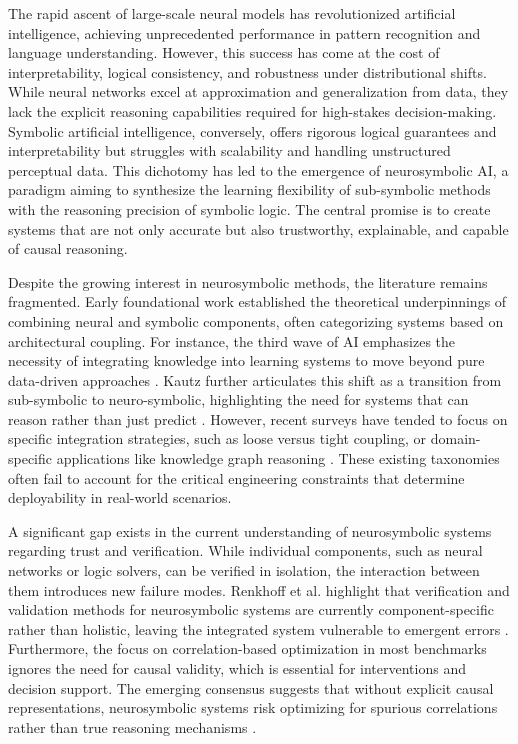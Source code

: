 \documentclass{article}
\begin{document}
The rapid ascent of large-scale neural models has revolutionized artificial intelligence, achieving unprecedented performance in pattern recognition and language understanding. However, this success has come at the cost of interpretability, logical consistency, and robustness under distributional shifts. While neural networks excel at approximation and generalization from data, they lack the explicit reasoning capabilities required for high-stakes decision-making. Symbolic artificial intelligence, conversely, offers rigorous logical guarantees and interpretability but struggles with scalability and handling unstructured perceptual data. This dichotomy has led to the emergence of neurosymbolic AI, a paradigm aiming to synthesize the learning flexibility of sub-symbolic methods with the reasoning precision of symbolic logic. The central promise is to create systems that are not only accurate but also trustworthy, explainable, and capable of causal reasoning.

Despite the growing interest in neurosymbolic methods, the literature remains fragmented. Early foundational work established the theoretical underpinnings of combining neural and symbolic components, often categorizing systems based on architectural coupling. For instance, the third wave of AI emphasizes the necessity of integrating knowledge into learning systems to move beyond pure data-driven approaches \cite{garcez2020neurosymbolic}. Kautz further articulates this shift as a transition from sub-symbolic to neuro-symbolic, highlighting the need for systems that can reason rather than just predict \cite{kautz2022third}. However, recent surveys have tended to focus on specific integration strategies, such as loose versus tight coupling, or domain-specific applications like knowledge graph reasoning \cite{delong2023neurosymbolic}. These existing taxonomies often fail to account for the critical engineering constraints that determine deployability in real-world scenarios.

A significant gap exists in the current understanding of neurosymbolic systems regarding trust and verification. While individual components, such as neural networks or logic solvers, can be verified in isolation, the interaction between them introduces new failure modes. Renkhoff et al. highlight that verification and validation methods for neurosymbolic systems are currently component-specific rather than holistic, leaving the integrated system vulnerable to emergent errors \cite{renkhoff2024survey}. Furthermore, the focus on correlation-based optimization in most benchmarks ignores the need for causal validity, which is essential for interventions and decision support. The emerging consensus suggests that without explicit causal representations, neurosymbolic systems risk optimizing for spurious correlations rather than true reasoning mechanisms \cite{jaimini2024causal}.
\end{document}
